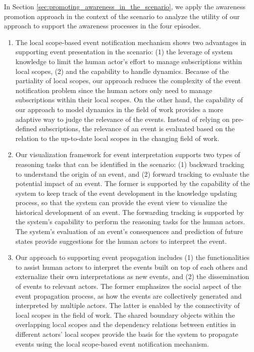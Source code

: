 In Section \ref{sec:promoting_awareness_in_the_scenario}, we apply the awareness promotion approach in the context of the scenario to analyze the utility of our approach to support the awareness processes in the four episodes. 
\begin{enumerate}
	\item The local scope-based event notification mechanism shows two advantages in supporting event presentation in the scenario: (1) the leverage of system knowledge to limit the human actor's effort to manage subscriptions within local scopes, (2) and the capability to handle dynamics. Because of the partiality of local scopes, our approach reduces the complexity of the event notification problem since the human actors only need to manage subscriptions within their local scopes. On the other hand, the capability of our approach to model dynamics in the field of work provides a more adaptive way to judge the relevance of the events. Instead of relying on pre-defined subscriptions, the relevance of an event is evaluated based on the relation to the up-to-date local scopes in the changing field of work.
	\item Our visualization framework for event interpretation supports two types of reasoning tasks that can be identified in the scenario: (1) backward tracking to understand the origin of an event, and (2) forward tracking to evaluate the potential impact of an event. The former is supported by the capability of the system to keep track of the event development in the knowledge updating process, so that the system can provide the event view to visualize the historical development of an event. The forwarding tracking is supported by the system's capability to perform the reasoning tasks for the human actors. The system's evaluation of an event's consequences and prediction of future states provide suggestions for the human actors to interpret the event. 
	\item Our approach to supporting event propagation includes (1) the functionalities to assist human actors to interpret the events built on top of each others and externalize their own interpretations as new events, and (2) the dissemination of events to relevant actors. The former emphasizes the social aspect of the event propagation process, as how the events are collectively generated and interpreted by multiple actors. The latter is enabled by the connectivity of local scopes in the field of work. The shared boundary objects within the overlapping local scopes and the dependency relations between entities in different actors' local scopes provide the basis for the system to propagate events using the local scope-based event notification mechanism.
\end{enumerate}





 

